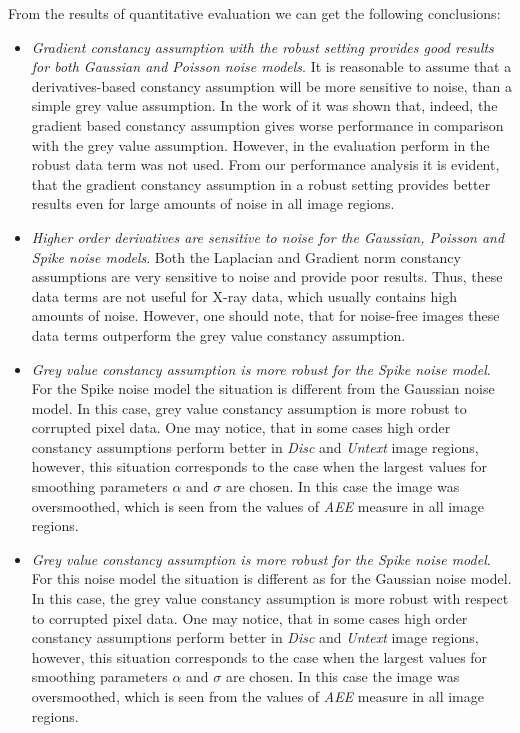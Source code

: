 From the results of quantitative evaluation we can get the following conclusions:
\begin{itemize}
	\item \textit{Gradient constancy assumption with the robust setting provides good results for both Gaussian and Poisson noise models}. It is reasonable to assume that a derivatives-based constancy assumption will be more sensitive to noise, than a simple grey value assumption. In the work of \cite{BruhnThesis} it was shown that, indeed, the gradient based constancy assumption gives worse performance in comparison with the grey value assumption. However, in the evaluation perform in \cite{BruhnThesis} the robust data term was not used. From our performance analysis it is evident, that the gradient constancy assumption in a robust setting provides better results even for large amounts of noise in all image regions. 
	    
	\item \textit{Higher order derivatives are sensitive to noise for the Gaussian, Poisson and Spike noise models}. Both the Laplacian and Gradient norm constancy assumptions are very sensitive to noise and provide poor results. Thus, these data terms are not useful for X-ray data, which usually contains high amounts of noise. However, one should note, that for noise-free images these data terms outperform the grey value constancy assumption. 
	
	\item \textit{Grey value constancy assumption is more robust for the Spike noise model}. For the Spike noise model the situation is different from the Gaussian noise model. In this case, grey value constancy assumption is more robust to corrupted pixel data. One may notice, that in some cases high order constancy assumptions perform better in \textit{Disc} and \textit{Untext} image regions, however, this situation corresponds to the case when the largest values for smoothing parameters $\alpha$ and $\sigma$ are chosen. In this case the image was oversmoothed, which is seen from the values of \textit{AEE} measure in all image regions. 

	\item \textit{Grey value constancy assumption is more robust for the Spike noise model}. For this noise model the situation is different as for the Gaussian noise model. In this case, the grey value constancy assumption is more robust with respect to corrupted pixel data. One may notice, that in some cases high order constancy assumptions perform better in \textit{Disc} and \textit{Untext} image regions, however, this situation corresponds to the case when the largest values for smoothing parameters $\alpha$ and $\sigma$ are chosen. In this case the image was oversmoothed, which is seen from the values of \textit{AEE} measure in all image regions. 
	

\end{itemize}
